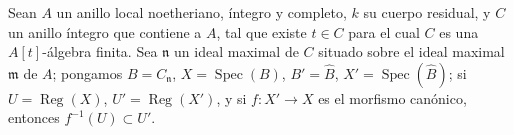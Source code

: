 \begin{lemma}[7.4.4.2]
\label{IV.2.s7.4.4.2-fr}
Sean $A$ un anillo local noetheriano, íntegro y completo, $k$ su cuerpo
residual, y $C$ un anillo íntegro que contiene a $A$, tal que existe
$t\in C$ para el cual $C$ es una $A[t]$-álgebra finita. Sea $\mathfrak n$
un ideal maximal de $C$ situado sobre el ideal maximal $\mathfrak m$ de
$A$; pongamos $B=C_{\mathfrak n}$, $X=\operatorname{Spec}(B)$,
$B'=\widehat B$, $X'=\operatorname{Spec}(\widehat B)$; si
$U=\operatorname{Reg}(X)$, $U'=\operatorname{Reg}(X')$, y si
$f:X'\to X$ es el morfismo canónico, entonces
$f^{-1}(U)\subset U'$.
\end{lemma}
